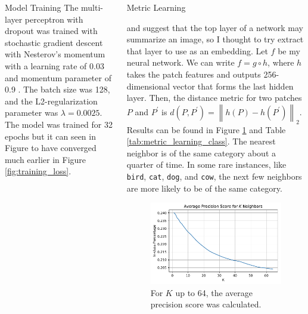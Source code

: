 \documentclass[final]{beamer}
\newlength{\onecolwid}
\newlength{\twocolwid}
\begin{document}
\begin{frame}[t]
\begin{columns}[t]
\begin{column}{\twocolwid}
\begin{columns}[t,totalwidth=\twocolwid]
\begin{column}{\onecolwid}
\begin{block}{Model Training}
      The multi-layer perceptron with dropout was trained with stochastic
      gradient descent with Nesterov's momentum with a learning rate of 0.03 and
      momentum parameter of 0.9 \citep{momentum}. The batch size was 128, and
      the L2-regularization parameter was $\lambda = 0.0025$. The model was
      trained for 32 epochs but it can seen in Figure to have converged much
      earlier in Figure \ref{fig:training_loss}.
\end{block}


\end{column} %

\begin{column}{\onecolwid} %

\begin{block}{Metric Learning}

  \cite{neural_codes} and \cite{imagenet} suggest that the top layer of a
  network may summarize an image, so I thought to try extract that layer to use
  as an embedding. Let $f$ be my neural network. We can write $f = g \circ h$,
  where $h$ takes the patch features and outputs 256-dimensional vector that
  forms the last hidden layer. Then, the distance metric for two patches $P$ and
  $P^\prime$ is
  $d\left(P,P^\prime\right) = \left\lVert h\left(P\right) -
    h\left(P^\prime\right)\right\rVert_2$. Results can be found in Figure
  \ref{fig:metric_average_precision_score} and Table
  \ref{tab:metric_learning_class}. The nearest neighbor is of the same category
  about a quarter of time. In some rare instances, like \texttt{bird},
  \texttt{cat}, \texttt{dog}, and \texttt{cow}, the next few neighbors are more
  likely to be of the same category.
  
  \begin{figure}
    \centering
    \includegraphics[scale=1.5]{../project/metric_learning/metric_average_precision_score.pdf}
    \caption{For $K$ up to 64, the average precision score was calculated.}
    \label{fig:metric_average_precision_score}
  \end{figure}
  

\end{block}
\end{column}
\end{columns}
\end{column}
\end{columns}
\end{frame}
\end{document}
